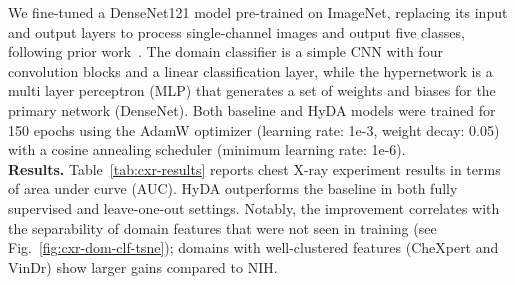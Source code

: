 \documentclass[runningheads]{llncs}
\begin{document}
 We fine-tuned a DenseNet121 model pre-trained on ImageNet, replacing its input and output layers to process single-channel images and output five classes, following prior work~\cite{cxr-chexnet,cxr-xrv}. The domain classifier is a simple CNN with four convolution blocks and a linear classification layer, while the hypernetwork is a multi layer perceptron (MLP) that generates a set of weights and biases for the primary network (DenseNet). Both baseline and HyDA models were trained for 150 epochs using the AdamW optimizer (learning rate: 1e-3, weight decay: 0.05) with a cosine annealing scheduler (minimum learning rate: 1e-6). \\
\noindent\textbf{Results.}
Table~\ref{tab:cxr-results} reports chest X-ray experiment results in terms of area under curve (AUC). HyDA outperforms the baseline in both fully supervised and leave-one-out settings. Notably, the improvement correlates with the separability of domain features that were not seen in training (see Fig.~\ref{fig:cxr-dom-clf-tsne}); domains with well-clustered features (CheXpert and VinDr) show larger gains compared to NIH.
\end{document}
